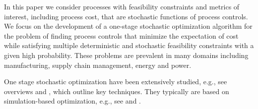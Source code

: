 \documentclass[a4paper, 12pt]{article} %
\begin{document}
In this paper we consider processes with feasibility constraints and metrics of interest, including  process cost, that are stochastic functions of process controls.
We focus on the development of a one-stage stochastic optimization algorithm for the problem of finding process controls that minimize the expectation of cost while satisfying multiple deterministic and stochastic feasibility constraints with a given high probability. 
These problems are prevalent in many domains including manufacturing, supply chain management, energy and power. 

One stage stochastic optimization have been extensively studied, e.g., see overviews \cite{FIGUEIRA2014118} and \cite{JUAN201562}, which outline key techniques.
They typically are based on simulation-based optimization, e.g., see \cite{Amaran2016} and \cite{Nguyen2014}.  
%
\end{document}
